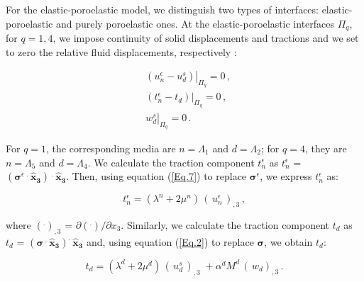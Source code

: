 \documentclass[draft]{agujournal2019}
\begin{document}
For the elastic-poroelastic model, we distinguish two types of interfaces: elastic-poroelastic and purely poroelastic ones. At the elastic-poroelastic interfaces $\Pi_q$, for  $q=1,4$,
we impose continuity of solid displacements and tractions and we set to zero the relative fluid displacements, respectively \cite{Deresiewicz1963}: 
\begin{linenomath*}
\begin{equation}\label{Eq.13}
\begin{split}
&  \left. \left(  u_n^\epsilon -  u_d^s \right) \right \rvert_{\Pi_q} = 0 \,, \\
&  \left. \left(  t_n^\epsilon -  t_d \right) \right \rvert_{\Pi_q} = 0 \,,\\
& \left.  w_d^s \right \rvert_{\Pi_q} = 0 \,.
\end{split}
\end{equation}
\end{linenomath*}
For $q=1$, the corresponding media are $n=\Lambda_1$ and $d=\Lambda_2$; for $q=4$, they are $n=\Lambda_5$ and $d=\Lambda_4$.
We calculate the traction component $t_n^\epsilon$ as $t_n^\epsilon$ = $ ({\bm{\sigma}^\epsilon} \,^{\bm{.}} \,\bm{\hat x_3}) \, ^{\bm{.}} \, \bm{\hat x_3}$. Then, using equation (\ref{Eq.7}) to replace $\bm{\sigma}^\epsilon$, we express $t_n^\epsilon$ as:
\begin{linenomath*}
\begin{equation}\label{Eq.14}
t_n^\epsilon =(\lambda^n + 2 \mu^n)\,  \left( \, u_n^{\epsilon} \, \right)_{,3} \,,
\end{equation}
\end{linenomath*}
where  $(^.)_{,3}$ = $\partial (^.)/ \partial{x_3}$. 
Similarly,  we calculate the traction component $t_d$ as $t_d$ = $(\bm{\sigma} \, ^{\bm{.}} \, \bm{\hat x_3}) ^{\bm{.}} \, \bm{\hat x_3}$ and, using equation (\ref{Eq.2}) to replace  $\bm{\sigma}$, we obtain $t_d$:
\begin{linenomath*}
\begin{equation}\label{Eq.15}
t_d =  (\lambda^d + 2 \mu^d)\,  \left( \, u_d ^s \, \right)_{,3}\; + \alpha^d M^d \,  \left( \, w_d \right)_{,3} \,.
\end{equation}
\end{linenomath*}
\end{document}
